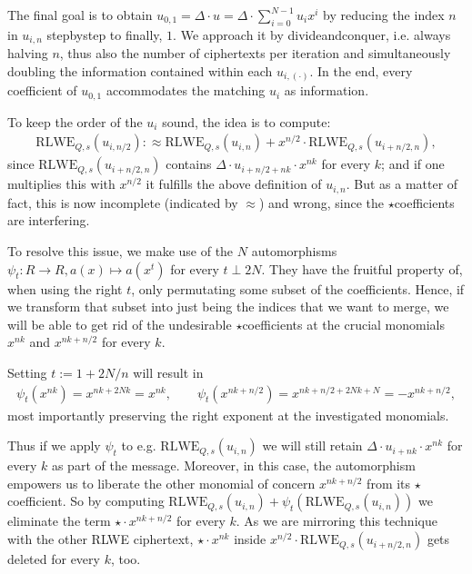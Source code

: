 \documentclass[letterpaper,10pt,english]{jupyterBook}
\begin{document}
\sphinxAtStartPar
The final goal is to obtain \(u_{0,1} = \Delta \cdot u = \Delta \cdot \sum_{i=0}^{N-1} u_i x^i\) by reducing the index \(n\) in \(u_{i,n}\) step\sphinxhyphen{}by\sphinxhyphen{}step to finally, \(1\).
We approach it by divide\sphinxhyphen{}and\sphinxhyphen{}conquer, i.e. always halving \(n\), thus also the number of ciphertexts per iteration and simultaneously doubling the information contained within each \(u_{i,(\cdot)}\).
In the end, every coefficient of \(u_{0,1}\) accommodates the matching \(u_i\) as information.

\sphinxAtStartPar
To keep the order of the \(u_i\) sound, the idea is to compute:
\begin{equation*}
\begin{split}\mathrm{RLWE}_{Q,s}(u_{i,n/2}) :\approx \mathrm{RLWE}_{Q,s}(u_{i,n}) + x^{n/2} \cdot \mathrm{RLWE}_{Q,s}(u_{i+n/2,n}),\end{split}
\end{equation*}
\sphinxAtStartPar
since \(\mathrm{RLWE}_{Q,s}(u_{i+n/2,n})\) contains \(\Delta\cdot u_{i+n/2+nk} \cdot x^{nk}\) for every \(k\);
and if one multiplies this with \(x^{n/2}\) it fulfills the above definition of \(u_{i,n}\).
But as a matter of fact, this is now incomplete (indicated by \(\approx\)) and wrong, since the \(\star\)\sphinxhyphen{}coefficients are interfering.

\sphinxAtStartPar
To resolve this issue, we make use of the \(N\) automorphisms \(\psi_t: R \rightarrow R, a(x) \mapsto a(x^t)\) for every \(t \perp 2N\).
They have the fruitful property of, when using the right \(t\), only permutating some subset of the coefficients.
Hence, if we transform that subset into just being the indices that we want to merge, we will be able to get rid of the undesirable \(\star\)\sphinxhyphen{}coefficients at the crucial monomials \(x^{nk}\) and \(x^{nk+n/2}\) for every \(k\).

\sphinxAtStartPar
Setting \(t := 1+2N/n\) will result in
\begin{equation*}
\begin{split}\psi_t(x^{nk}) = x^{nk+2Nk} = x^{nk}, \qquad \psi_t(x^{nk+n/2}) = x^{nk+n/2+2Nk+N} = - x^{nk+n/2},\end{split}
\end{equation*}
\sphinxAtStartPar
most importantly preserving the right exponent at the investigated monomials.

\sphinxAtStartPar
Thus if we apply \(\psi_t\) to e.g. \(\mathrm{RLWE}_{Q,s}(u_{i,n})\) we will still retain \(\Delta \cdot u_{i+nk} \cdot x^{nk}\) for every \(k\) as part of the message.
Moreover, in this case, the automorphism empowers us to liberate the other monomial of concern \(x^{nk+n/2}\) from its \(\star\) coefficient.
So by computing \(\mathrm{RLWE}_{Q,s}(u_{i,n}) + \psi_t(\mathrm{RLWE}_{Q,s}(u_{i,n}))\) we eliminate the term \(\star \cdot x^{nk+n/2}\) for every \(k\).
As we are mirroring this technique with the other RLWE ciphertext, \(\star \cdot x^{nk}\) inside \(x^{n/2} \cdot \mathrm{RLWE}_{Q,s}(u_{i+n/2,n})\) gets deleted for every \(k\), too.
\end{document}
